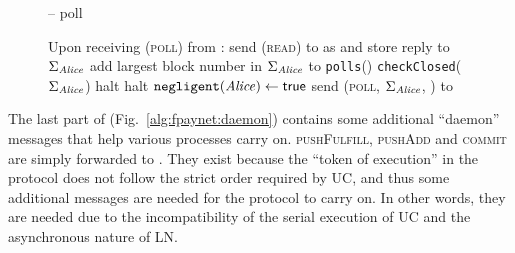   \begin{figure}[H]
    \begin{systembox}{\fpaynet{} -- poll}
      \begin{algorithmic}[1]
        \State Upon receiving (\textsc{poll}) from \alice:
        \Indent
          \State send (\textsc{read}) to \ledger{} as \alice{} and store reply
          to $\Sigma_{\mathit{Alice}}$
          \State add largest block number in $\Sigma_{\mathit{Alice}}$ to
          \texttt{polls}(\alice)
          \label{alg:fpaynet:poll:height}
          \State \texttt{checkClosed}($\Sigma_{\mathit{Alice}}$)
          \label{alg:fpaynet:poll:read}
          \label{alg:fpaynet:poll:ifdsforgery}
            \State halt 
            \label{alg:fpaynet:poll:dsforgery}
          \EndIf
          \label{alg:fpaynet:poll:malicious}
              \label{alg:fpaynet:poll:haspolled}
                \State halt 
                \label{alg:fpaynet:poll:haspolled:halt}
              \Else
                \State $\mathtt{negligent}(\mathit{Alice}) \gets \mathsf{true}$
                \label{alg:fpaynet:poll:negligent}
              \EndIf
            \EndIf
          \EndFor
          \State send (\textsc{poll}, $\Sigma_{\mathit{Alice}}$, \alice) to \simulator
          \label{alg:fpaynet:poll:send}
        \EndIndent
      \end{algorithmic}
    \end{systembox}
    \caption{}
    \label{alg:fpaynet:poll}
  \end{figure}

  The last part of \fpaynet{} (Fig.~\ref{alg:fpaynet:daemon}) contains some
  additional ``daemon'' messages that help various processes carry on.
  \textsc{pushFulfill}, \textsc{pushAdd} and \textsc{commit} are simply
  forwarded to \simulator. They exist because the ``token of execution'' in the
  protocol does not follow the strict order required by UC, and thus some
  additional messages are needed for the protocol to carry on. In other words,
  they are needed due to the incompatibility of the serial execution of UC and
  the asynchronous nature of LN.


